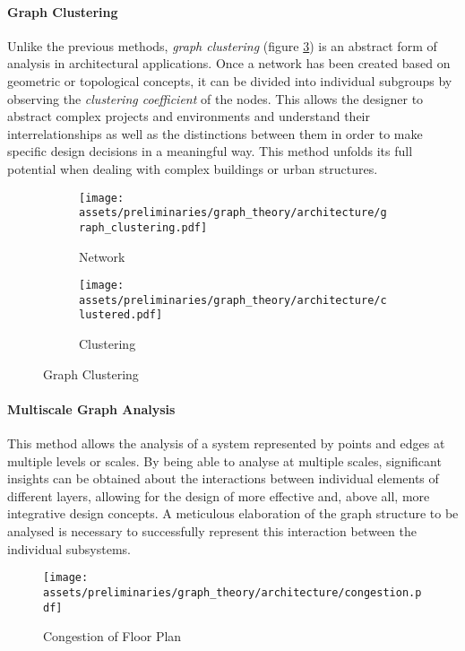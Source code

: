 \documentclass[a4paper, 12pt]{report}
\begin{document}
\paragraph{Graph Clustering}\label{par:graph-clustering}

Unlike the previous methods, \textit{graph clustering} (figure \ref{fig:graph-clustering}) is an abstract form of analysis in architectural applications. Once a network has been created based on geometric or topological concepts, it can be divided into individual subgroups by observing the \textit{clustering coefficient} of the nodes. This allows the designer to abstract complex projects and environments and understand their interrelationships as well as the distinctions between them in order to make specific design decisions in a meaningful way. This method unfolds its full potential when dealing with complex buildings or urban structures.

\begin{figure}
\centering
\begin{subfigure}{.5\textwidth}
\centering
\texttt{[image: assets/preliminaries/graph\_theory/architecture/graph\_clustering.pdf]}
\caption{Network}
\label{fig:network}
\end{subfigure}%
\begin{subfigure}{.5\textwidth}
\centering
\texttt{[image: assets/preliminaries/graph\_theory/architecture/clustered.pdf]}
\caption{Clustering}
\label{fig:clustering}
\end{subfigure}
\caption{Graph Clustering}
\label{fig:graph-clustering}
\end{figure}

\paragraph{Multiscale Graph Analysis}\label{par:multiscale-graph-analysis}

This method allows the analysis of a system represented by points and edges at multiple levels or scales. By being able to analyse at multiple scales, significant insights can be obtained about the interactions between individual elements of different layers, allowing for the design of more effective and, above all, more integrative design concepts. A meticulous elaboration of the graph structure to be analysed is necessary to successfully represent this interaction between the individual subsystems.

\begin{figure}
\centering
\texttt{[image: assets/preliminaries/graph\_theory/architecture/congestion.pdf]}
\caption{Congestion of Floor Plan}
\label{fig:congestion-of-floor-plan}
\end{figure}
\end{document}
